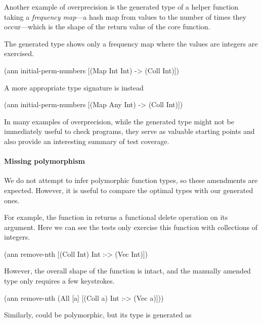 Another example of overprecision is the generated type
of  a helper function
taking a \emph{frequency map}---a hash map from values
to the number of times they occur---which is the shape
of the return value of the core 
function.

The generated type shows only a frequency map where
the values are integers are exercised.

\begin{cljlisting}
(ann initial-perm-numbers
  [(Map Int Int) -> (Coll Int)])
\end{cljlisting}

A more appropriate type signature is instead

\begin{cljlisting}
(ann initial-perm-numbers
  [(Map Any Int) -> (Coll Int)])
\end{cljlisting}

In many examples of overprecision, while the generated
type might not be immediately useful to check programs,
they serve as valuable starting points and also provide
an interesting summary of test coverage.

\paragraph{Missing polymorphism}

We do not attempt to infer polymorphic function types, 
so these amendments are expected. However, it is useful
to compare the optimal types with our generated ones.

For example, the  function in 
returns a functional delete operation on its argument.
Here we can see the tests only exercise this function with
collections of integers.

\begin{cljlisting}
(ann remove-nth [(Coll Int) Int :-> (Vec Int)])
\end{cljlisting}

However, the overall shape of the function is intact,
and the manually amended type only requires a few 
keystrokes.

\begin{cljlisting}
(ann remove-nth
  (All [a] [(Coll a) Int :-> (Vec a)]))
\end{cljlisting}

Similarly,  could be polymorphic, 
but its type is generated as

